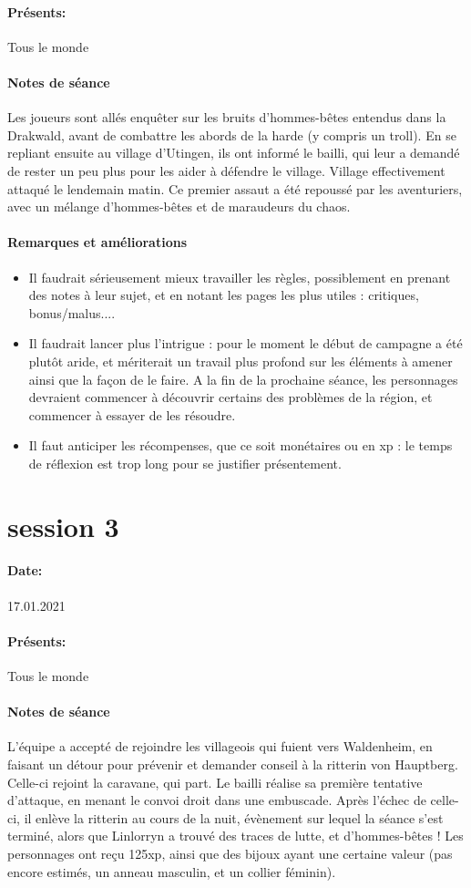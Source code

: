 \documentclass[10pt,a4paper]{book}
\begin{document}
\paragraph{Présents:}Tous le monde
\paragraph{Notes de séance}
Les joueurs sont allés enquêter sur les bruits d'hommes-bêtes entendus dans la Drakwald, avant de combattre les abords de la harde (y compris un troll). En se repliant ensuite au village d'Utingen, ils ont informé le bailli, qui leur a demandé de rester un peu plus pour les aider à défendre le village. Village effectivement attaqué le lendemain matin. Ce premier assaut a été repoussé par les aventuriers, avec un mélange d'hommes-bêtes et de maraudeurs du chaos.
\paragraph{Remarques et améliorations}
\begin{itemize}
\item Il faudrait sérieusement mieux travailler les règles, possiblement en prenant des notes à leur sujet, et en notant les pages les plus utiles : critiques, bonus/malus....
\item Il faudrait lancer plus l'intrigue : pour le moment le début de campagne a été plutôt aride, et mériterait un travail plus profond sur les éléments à amener ainsi que la façon de le faire. A la fin de la prochaine séance, les personnages devraient commencer à découvrir certains des problèmes de la région, et commencer à essayer de les résoudre.
\item Il faut anticiper les récompenses, que ce soit monétaires ou en xp : le temps de réflexion est trop long pour se justifier présentement.
\end{itemize}
\section{session 3}
\paragraph{Date:} 17.01.2021
\paragraph{Présents:}Tous le monde
\paragraph{Notes de séance} L'équipe a accepté de rejoindre les villageois qui fuient vers Waldenheim, en faisant un détour pour prévenir et demander conseil à la ritterin von Hauptberg. Celle-ci rejoint la caravane, qui part. Le bailli réalise sa première tentative d'attaque, en menant le convoi droit dans une embuscade. Après l'échec de celle-ci, il enlève la ritterin au cours de la nuit, évènement sur lequel la séance s'est terminé, alors que Linlorryn a trouvé des traces de lutte, et d'hommes-bêtes ! Les personnages ont reçu 125xp, ainsi que des bijoux ayant une certaine valeur (pas encore estimés, un anneau masculin, et un collier féminin).
\end{document}
